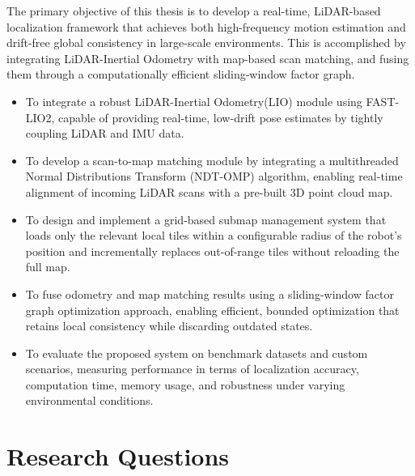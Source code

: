 The primary objective of this thesis is to develop a real-time, LiDAR-based localization framework that achieves both high-frequency motion estimation and drift-free global consistency in large-scale environments. This is accomplished by integrating LiDAR-Inertial Odometry with map-based scan matching, and fusing them through a computationally efficient sliding-window factor graph.
\begin{itemize}
    \item To integrate a robust LiDAR-Inertial Odometry(LIO) module using FAST-LIO2, capable of providing real-time, low-drift pose estimates by tightly coupling LiDAR and IMU data.
    \item To develop a scan-to-map matching module by integrating a multithreaded Normal Distributions Transform (NDT-OMP) algorithm, enabling real-time alignment of incoming LiDAR scans with a pre-built 3D point cloud map. 

    \item To design and implement a grid-based submap management system that loads only the relevant local tiles within a configurable radius of the robot’s position and incrementally replaces out-of-range tiles without reloading the full map.\item To fuse odometry and map matching results using a sliding-window factor graph optimization approach, enabling efficient, bounded optimization that retains local consistency while discarding outdated states.
    \item To evaluate the proposed system on benchmark datasets and custom scenarios, measuring performance in terms of localization accuracy, computation time, memory usage, and robustness under varying environmental conditions.
\end{itemize}
\section{Research Questions}


